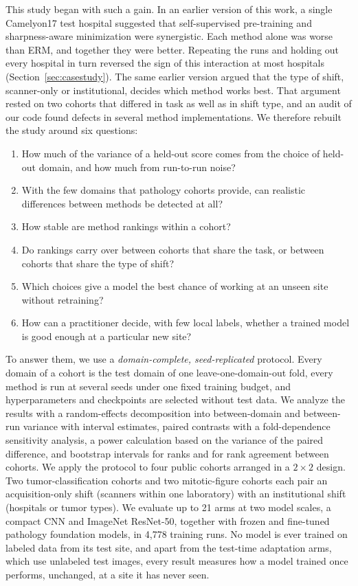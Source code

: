 This study began with such a gain. In an earlier version of this work, a
single Camelyon17 test hospital suggested that self-supervised pre-training and
sharpness-aware minimization were synergistic. Each method alone was worse than
ERM, and together they were better. Repeating the runs and holding out every
hospital in turn reversed the sign of this interaction at most hospitals
(Section~\ref{sec:casestudy}). The same earlier version argued that the type of
shift, scanner-only or institutional, decides which method works best. That
argument rested on two cohorts that differed in task as well as in shift type,
and an audit of our code found defects in several method implementations. We
therefore rebuilt the study around six questions:
\begin{enumerate}
  \item How much of the variance of a held-out score comes from the choice of
    held-out domain, and how much from run-to-run noise?
  \item With the few domains that pathology cohorts provide, can realistic
    differences between methods be detected at all?
  \item How stable are method rankings within a cohort?
  \item Do rankings carry over between cohorts that share the task, or between
    cohorts that share the type of shift?
  \item Which choices give a model the best chance of working at an unseen site
    without retraining?
  \item How can a practitioner decide, with few local labels, whether a trained
    model is good enough at a particular new site?
\end{enumerate}

To answer them, we use a \emph{domain-complete, seed-replicated} protocol.
Every domain of a cohort is the test domain of one leave-one-domain-out fold,
every method is run at several seeds under one fixed training budget, and
hyperparameters and checkpoints are selected without test data. We analyze the
results with a random-effects decomposition into between-domain and
between-run variance with interval estimates, paired contrasts with a
fold-dependence sensitivity analysis, a power calculation based on the
variance of the paired difference, and bootstrap intervals for ranks and for
rank agreement between cohorts. We apply the protocol to four public cohorts
arranged in a $2\times2$ design. Two tumor-classification cohorts and two
mitotic-figure cohorts each pair an acquisition-only shift (scanners within
one laboratory) with an institutional shift (hospitals or tumor types).
We evaluate up to 21 arms at two model scales, a compact CNN and ImageNet
ResNet-50, together with frozen and fine-tuned pathology foundation models,
in 4,778 training runs. No model is ever trained on labeled data from its test
site, and apart from the test-time adaptation arms, which use unlabeled test
images, every result measures how a model trained once performs, unchanged, at
a site it has never seen.

